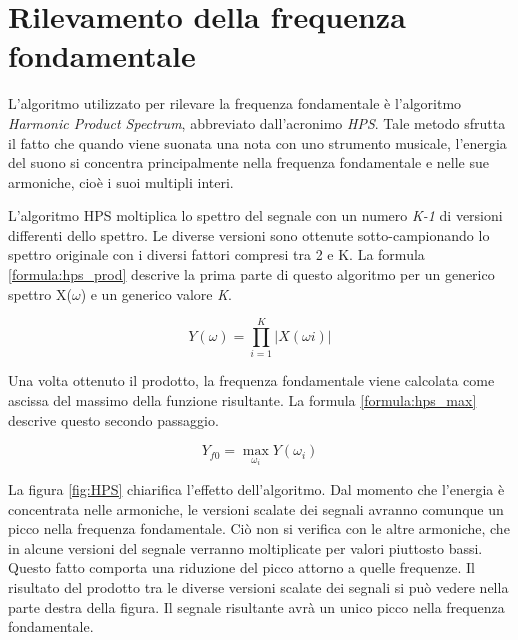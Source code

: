 \chapter*{Rilevamento della frequenza fondamentale}\label{cap:rilevamento_frequenza}

L'algoritmo utilizzato per rilevare la frequenza fondamentale è l'algoritmo \emph{Harmonic Product Spectrum}, abbreviato dall'acronimo \emph{HPS}.
Tale metodo sfrutta il fatto che quando viene suonata una nota con uno strumento musicale, l'energia del suono si concentra principalmente nella frequenza fondamentale e nelle sue armoniche, cioè i suoi multipli interi.

L'algoritmo HPS moltiplica lo spettro del segnale con un numero \emph{K-1} di versioni differenti dello spettro.
Le diverse versioni sono ottenute sotto-campionando lo spettro originale con i diversi fattori compresi tra 2 e K.
La formula \ref{formula:hps_prod} descrive la prima parte di questo algoritmo per un generico spettro X($\omega$) e un generico valore \emph{K}.

	\begin{equation}\label{formula:hps_prod}
		Y(\omega) = \prod_{i=1}^K \left | X(\omega i) \right |
	\end{equation}

Una volta ottenuto il prodotto, la frequenza fondamentale viene calcolata come ascissa del massimo della funzione risultante. 
La formula \ref{formula:hps_max} descrive questo secondo passaggio.

	\begin{equation}\label{formula:hps_max}
		Y_{f0} = \max_{\omega_i} Y \left(\omega_i \right )
	\end{equation}

La figura \ref{fig:HPS} chiarifica l'effetto dell'algoritmo. 
Dal momento che l'energia è concentrata nelle armoniche, le versioni scalate dei segnali avranno comunque un picco nella frequenza fondamentale. 
Ciò non si verifica con le altre armoniche, che in alcune versioni del segnale verranno moltiplicate per valori piuttosto bassi. 
Questo fatto comporta una riduzione del picco attorno a quelle frequenze. 
Il risultato del prodotto tra le diverse versioni scalate dei segnali si può vedere nella parte destra della figura. 
Il segnale risultante avrà un unico picco nella frequenza fondamentale.

